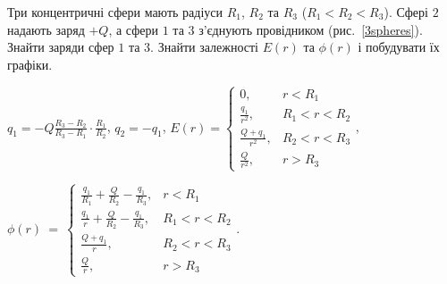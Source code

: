 \begin{problem}\label{prb:3spheres}
Три концентричні сфери мають радіуси $R_1$, $R_2$ та $R_3$ ($R_1 <R_2 < R_3$). Сфері $2$ надають заряд $+Q$, а сфери $1$ та $3$ з'єднують провідником (рис.~\ref{3spheres}). Знайти заряди сфер $1$ та $3$. Знайти залежності $E(r)$ та $\phi(r)$ і побудувати їх графіки.
\begin{solution}
	$q_1 = - Q\frac{R_3 - R_2}{R_3 - R_1}\cdot \frac{R_1}{R_2}$, $q_2= -q_1$,
	$
		E(r) =
		\begin{cases}
			0,                 & r < R_1       \\
			\frac{q_1}{r^2},   & R_1 < r < R_2 \\
			\frac{Q+q_1}{r^2}, & R_2 < r < R_3 \\
			\frac{Q}{r^2},     & r > R_3
		\end{cases}
	$,

	$
		\phi(r)~=~%
		\begin{cases}
			\frac{q_1}{R_1} + \frac{Q}{R_2} - \frac{q_1}{R_3}, & r < R_1       \\
			\frac{q_1}{r} + \frac{Q}{R_2} - \frac{q_1}{R_3},   & R_1 < r < R_2 \\
			\frac{Q+q_1}{r},                                   & R_2 < r < R_3 \\
			\frac{Q}{r},                                       & r > R_3
		\end{cases}
	$.
\end{solution}
\end{problem}

